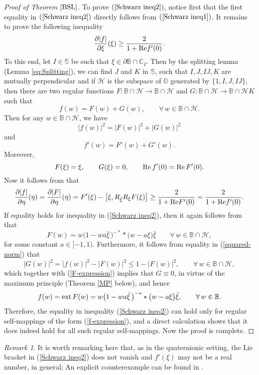 \documentclass{amsart}
\theoremstyle{definition}
\theoremstyle{remark}
\newtheorem{remark}[theorem]{Remark}
\numberwithin{equation}{section}
\begin{document}
\begin{proof}[Proof of Theorem $\ref{BSL}$]
To prove $(\ref{Schwarz ineq2})$, notice first that the first equality in $(\ref{Schwarz ineq2})$ directly follows from  $(\ref{Schwarz ineq1})$. It remains to prove the following inequality
$$\frac{\partial |f|}{\partial \xi}(\xi)\geq\frac{2}{1+{\rm{Re}}f'(0)}.$$
To this end, let $I\in\mathbb S$ be such that $\xi\in \partial\mathbb B\cap \mathbb C_I$. Then by the splitting lemma (Lemma \ref{eq:Splitting}), we can find $J$ and $K$ in $\mathbb S$, such that $I, J, IJ, K$ are mutually perpendicular and if $\mathcal{H}$ is the subspace of $\mathbb O$ generated by $\{1, I, J, IJ\}$, then there are two regular functions
$F: \mathbb B\cap\mathcal{H}\rightarrow\mathbb B\cap\mathcal{H}$ and $G: \mathbb B\cap\mathcal{H}\rightarrow\mathbb B\cap\mathcal{H}K$  such that
$$f(w)=F(w)+G(w),\qquad \forall\, w\in\mathbb B\cap\mathcal{H}.$$
 Then for any $w\in\mathbb B\cap\mathcal{H}$, we have
\begin{equation}\label{squared-norm}
|f(w)|^2=|F(w)|^2+|G(w)|^2
\end{equation}
and
$$f'(w)=F'(w)+G'(w).$$
Moreover,
$$F(\xi)=\xi, \qquad G(\xi)=0, \qquad {\rm{Re}}\,f'(0)={\rm{Re}}\,F'(0).$$
Now it follows from \cite[Corollary 2.6]{WR} that
$$\frac{\partial |f|}{\partial \eta}(\eta)
=\frac{\partial |F|}{\partial \eta}(\eta)
=F'(\xi)-\big[\xi,R_{\bar{\xi}}R_{\xi}F(\xi)\big]
\geq\frac{2}{1+{\rm{Re}}F'(0)}=\frac{2}{1+{\rm{Re}}f'(0)}.$$
If equality holds for inequality in (\ref{Schwarz ineq2}), then it again follows from \cite[Corollary 2.6]{WR} that
\begin{equation}\label{F-expression}
F(w)=w\big(1-wa\bar{\xi}\,\big)^{-\ast}\ast\big(w-a\xi\big)\bar{\xi}
\qquad \forall\, w\in\mathbb B\cap\mathcal{H},
\end{equation}
for some constant $a\in [-1,1)$. Furthermore, it follows from equality in (\ref{squared-norm}) that
$$|G(w)|^2=|f(w)|^2-|F(w)|^2\leq 1-|F(w)|^2, \qquad \forall\, w\in\mathbb B\cap\mathcal{H},$$
which together with (\ref{F-expression}) implies that $G\equiv0$, in virtue of the maximum principle (Theorem \ref{MP} below),
and hence
$$f(w)={\rm{ext}}\,F(w)=w\big(1-wa\bar{\xi}\,\big)^{-\ast}\ast\big(w-a\xi\big)\bar{\xi},\qquad \forall\, w\in\mathbb B.$$
Therefore, the equality in inequality (\ref{Schwarz ineq2}) can hold only for regular self-mappings  of  the form (\ref{f-expression}), and a direct calculation shows that it does indeed hold for all such regular self-mappings. Now  the proof is complete.
\end{proof}

\begin{remark}\label{Non-real}
It is worth remarking here that, as in the quaternionic setting, the Lie bracket
in (\ref{Schwarz ineq2}) does not vanish
and $f'(\xi)$ may not be a real number, in general; An explicit counterexample can be found in \cite[Example 4.5]{WR}.
\end{remark}
\end{document}
